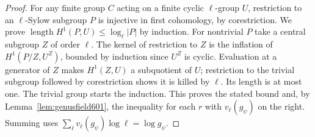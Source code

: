 \documentclass[a4paper,11pt]{article}
\theoremstyle{definition}
\theoremstyle{remark}
\numberwithin{equation}{section}
\begin{document}
\begin{proof}
For any finite group \(C\) acting on a finite cyclic
\(\ell\)-group \(U\), restriction to an \(\ell\)-Sylow
subgroup \(P\) is injective in first cohomology, by
corestriction. We prove
\(\operatorname{length}H^1(P,U)\le\log_\ell |P|\)
by induction. For nontrivial \(P\) take a central
subgroup \(Z\) of order \(\ell\). The kernel of
restriction to \(Z\) is the inflation of
\(H^1(P/Z,U^Z)\), bounded by induction since \(U^Z\)
is cyclic. Evaluation at a generator of \(Z\) makes
\(H^1(Z,U)\) a subquotient of \(U\); restriction to
the trivial subgroup followed by corestriction shows
it is killed by \(\ell\). Its length is at most one.
The trivial group starts the induction. This proves
the stated bound and, by Lemma~\ref{lem:genusfield601},
the inequality for each \(r\) with \(v_\ell(g_\psi)\)
on the right. Summing uses
\(\sum_\ell v_\ell(g_\psi)\log\ell=\log g_\psi\).
\end{proof}
\end{document}
